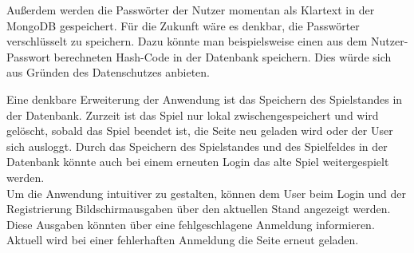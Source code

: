 Außerdem werden die Passwörter der Nutzer momentan als Klartext in der MongoDB gespeichert. Für die Zukunft wäre es denkbar, die Passwörter verschlüsselt zu speichern. Dazu könnte man beispielsweise einen aus dem Nutzer-Passwort berechneten Hash-Code in der Datenbank speichern. Dies würde sich aus Gründen des Datenschutzes anbieten.

Eine denkbare Erweiterung der Anwendung ist das Speichern des Spielstandes in der Datenbank. Zurzeit ist das Spiel nur lokal zwischengespeichert und wird gelöscht, sobald das Spiel beendet ist, die Seite neu geladen wird oder der User sich ausloggt. Durch das Speichern des Spielstandes und des Spielfeldes in der Datenbank könnte auch bei einem erneuten Login das alte Spiel weitergespielt werden.\\
Um die Anwendung intuitiver zu gestalten, können dem User beim Login und der Registrierung Bildschirmausgaben über den aktuellen Stand angezeigt werden. Diese Ausgaben könnten über eine fehlgeschlagene Anmeldung informieren. Aktuell wird bei einer fehlerhaften Anmeldung die Seite erneut geladen. 